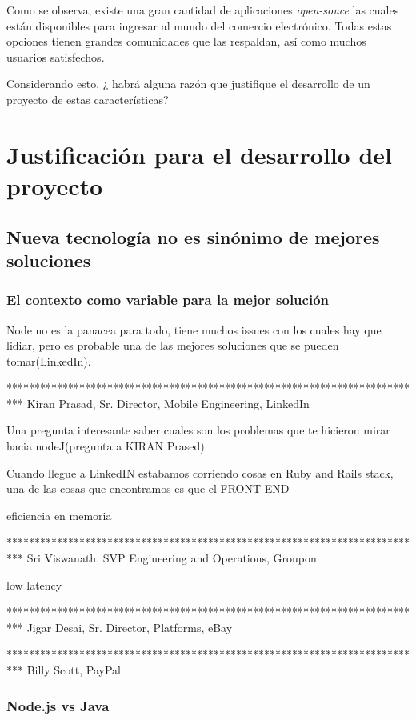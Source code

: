 Como se observa, existe una gran cantidad de aplicaciones \textit{open-souce} las cuales están disponibles para ingresar al mundo del comercio electrónico. Todas estas opciones tienen grandes comunidades que las respaldan, así como muchos usuarios satisfechos. 

Considerando esto, ¿ habrá alguna razón que justifique el desarrollo de un proyecto de estas características?

\section{Justificación para el desarrollo del proyecto}\label{cap:estadoArte:justificacion_proyecto}

\subsection{Nueva tecnología no es sinónimo de mejores soluciones}
\subsubsection{El contexto como variable para la mejor solución}


Node no es la panacea para todo, tiene muchos issues con los cuales hay que lidiar, pero es probable una de las mejores soluciones que se pueden tomar(LinkedIn).

***************************************************************************
Kiran Prasad, Sr. Director, Mobile Engineering, LinkedIn

Una pregunta interesante saber cuales son los problemas que te hicieron mirar hacia nodeJ(pregunta a KIRAN Prased)

Cuando llegue a LinkedIN estabamos corriendo cosas en Ruby and Rails stack, una de las cosas que encontramos es que el FRONT-END 

eficiencia en memoria



***************************************************************************
Sri Viswanath, SVP Engineering and Operations, Groupon

low latency


***************************************************************************
Jigar Desai, Sr. Director, Platforms, eBay

***************************************************************************
Billy Scott, PayPal

\subsubsection{Node.js vs Java \cite{online_nodejs_paypal}}


